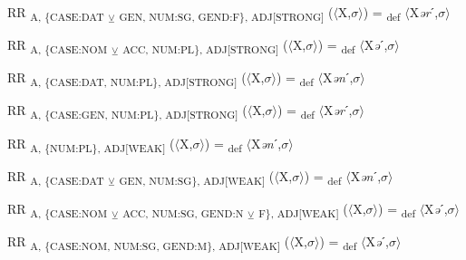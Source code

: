 {\begin{exe}
 RR \textsubscript{A, \{CASE:DAT} \textsubscript{${\veebar}$}\textsubscript{ GEN, NUM:SG, GEND:F\}, ADJ[STRONG]} ($\langle$X,$\sigma $$\rangle$) = \textsubscript{def} $\langle$X\textit{ər}ˊ,$\sigma $$\rangle$
\end{exe}

\begin{exe}
 RR \textsubscript{A, \{CASE:NOM} \textsubscript{${\veebar}$}\textsubscript{ ACC, NUM:PL\}, ADJ[STRONG]} ($\langle$X,$\sigma $$\rangle$) = \textsubscript{def} $\langle$X\textit{ə}ˊ,$\sigma $$\rangle$
\end{exe}

\begin{exe}
 RR \textsubscript{A, \{CASE:DAT, NUM:PL\}, ADJ[STRONG]} ($\langle$X,$\sigma $$\rangle$) = \textsubscript{def} $\langle$X\textit{ən}ˊ,$\sigma $$\rangle$
\end{exe}

\begin{exe}
 RR \textsubscript{A, \{CASE:GEN, NUM:PL\}, ADJ[STRONG]} ($\langle$X,$\sigma $$\rangle$) = \textsubscript{def} $\langle$X\textit{ər}ˊ,$\sigma $$\rangle$
\end{exe}

\begin{exe}
 RR \textsubscript{A, \{NUM:PL\}, ADJ[WEAK]} ($\langle$X,$\sigma $$\rangle$) = \textsubscript{def} $\langle$X\textit{ən}ˊ,$\sigma $$\rangle$
\end{exe}

\begin{exe}
 RR \textsubscript{A, \{CASE:DAT} \textsubscript{${\veebar}$}\textsubscript{ GEN, NUM:SG\}, ADJ[WEAK]} ($\langle$X,$\sigma $$\rangle$) = \textsubscript{def} $\langle$X\textit{ən}ˊ,$\sigma $$\rangle$
\end{exe}

\begin{exe}
 RR \textsubscript{A, \{CASE:NOM} \textsubscript{${\veebar}$}\textsubscript{ ACC, NUM:SG, GEND:N} \textsubscript{${\veebar}$}\textsubscript{ F\}, ADJ[WEAK]} ($\langle$X,$\sigma $$\rangle$) = \textsubscript{def} $\langle$X\textit{ə}ˊ,$\sigma $$\rangle$
\end{exe}

\begin{exe}
 RR \textsubscript{A, \{CASE:NOM, NUM:SG, GEND:M\}, ADJ[WEAK]} ($\langle$X,$\sigma $$\rangle$) = \textsubscript{def} $\langle$X\textit{ə}ˊ,$\sigma $$\rangle$
\end{exe}

}
